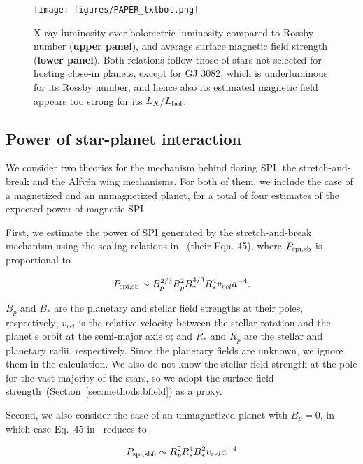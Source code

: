 \documentclass[twocolumn]{aastex631}
\begin{document}
\begin{figure}[ht!]
    \begin{centering}
        \texttt{[image: figures/PAPER\_lxlbol.png]}
        \caption{
           X-ray luminosity over bolometric luminosity compared to Rossby number (\textbf{upper panel}), and average surface magnetic field strength (\textbf{lower panel}). Both relations follow those of stars not selected for hosting close-in planets, except for GJ 3082, which is underluminous for its Rossby number, and hence also its estimated magnetic field appears too strong for its $L_X/L_{\rm bol}$.
        }
        \label{fig:lx}
    \end{centering}
\end{figure}

\subsection{Power of star-planet interaction}
\label{sec:methods:pspi}
We consider two theories for the mechanism behind flaring SPI, the stretch-and-break and the Alfv\'en wing mechanisms. For both of them, we include the case of a magnetized and an unmagnetized planet, for a total of four estimates of the expected power of magnetic SPI.

First, we estimate the power of SPI generated by the stretch-and-break mechanism using the scaling relations in~\cite{lanza2012starplanet} (their Eqn. 45), where $P_{\rm spi,sb}$ is proportional to

\begin{equation}
    P_{\rm spi,sb} \sim B_p^{2/3} R_p^2 B_*^{4/3} R_*^4 v_{rel} a^{-4} .
\end{equation}

$B_p$ and $B_*$ are the planetary and stellar field strengths at their poles, respectively; $v_{rel}$ is the relative velocity between the stellar rotation and the planet's orbit at the semi-major axis $a$; and $R_*$ and $R_p$ are the stellar and planetary radii, respectively. Since the planetary fields are unknown, we ignore them in the calculation. We also do not know the stellar field strength at the pole for the vast majority of the stars, so we adopt the surface field strength~(Section~\ref{sec:methods:bfield}) as a proxy.

Second, we also consider the case of an unmagnetized planet with $B_p=0$, in which case Eq.~45 in~\cite{lanza2012starplanet} reduces to

\begin{equation}
    P_{\rm spi,sb0} \sim R_p^2 R_*^4 B_*^2 v_{rel}    a^{-4} 
\end{equation}
\end{document}
